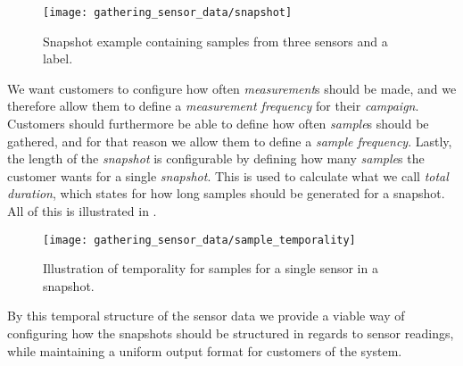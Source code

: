 \begin{figure}[!htbp]
    \centering
    \texttt{[image: gathering\_sensor\_data/snapshot]}
    \caption{Snapshot example containing samples from three sensors and a label.}
    \label{fig:snapshot_example_with_samples}
\end{figure}
\FloatBarrier

We want customers to configure how often \emph{measurement}s should be made, and we therefore allow them to define a \emph{measurement frequency} for their \emph{campaign}. Customers should furthermore be able to define how often \emph{sample}s should be gathered, and for that reason we allow them to define a \emph{sample frequency}. Lastly, the length of the \emph{snapshot} is configurable by defining how many \emph{sample}s the customer wants for a single \emph{snapshot}. This is used to calculate what we call \emph{total duration}, which states for how long samples should be generated for a snapshot. All of this is illustrated in . 


\begin{figure}[!htbp]
    \centering
    \texttt{[image: gathering\_sensor\_data/sample\_temporality]}
    \caption{Illustration of temporality for samples for a single sensor in a snapshot.}
    \label{fig:sample_temporality}
\end{figure}
\FloatBarrier

By this temporal structure of the sensor data we provide a viable way of configuring how the snapshots should be structured in regards to sensor readings, while maintaining a uniform output format for customers of the system.
